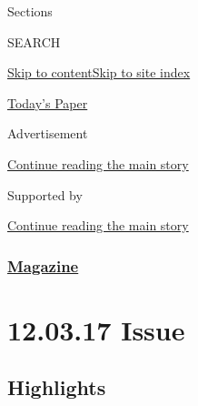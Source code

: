 Sections

SEARCH

\protect\hyperlink{site-content}{Skip to
content}\protect\hyperlink{site-index}{Skip to site index}

\href{https://myaccount.nytimes3xbfgragh.onion/auth/login?response_type=cookie\&client_id=vi}{}

\href{https://www.nytimes3xbfgragh.onion/section/todayspaper}{Today's
Paper}

Advertisement

\protect\hyperlink{after-top}{Continue reading the main story}

Supported by

\protect\hyperlink{after-sponsor}{Continue reading the main story}

\hypertarget{magazine}{%
\subsubsection{\texorpdfstring{\href{/section/magazine}{Magazine}}{Magazine}}\label{magazine}}

\hypertarget{120317-issue}{%
\section{12.03.17 Issue}\label{120317-issue}}

\hypertarget{highlights}{%
\subsection{Highlights}\label{highlights}}


